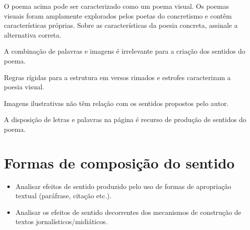 {

O poema acima pode ser caracterizado como um poema visual. Os poemas
visuais foram amplamente explorados pelos poetas do concretismo e contêm características próprias. Sobre as características da poesia
concreta, assinale a alternativa correta.

\begin{escolha}

  \item A combinação de palavras e imagens é irrelevante para a criação dos sentidos do poema. 

  \item Regras rígidas para a estrutura em versos rimados e estrofes 
  caracterizam a poesia visual.

  \item Imagens ilustrativas não têm relação com os sentidos propostos 
  pelo autor.

  \item A disposição de letras e palavras na página é recurso de produção de sentidos do poema.

\end{escolha}


\chapter{Formas de composição do sentido}


\begin{itemize}
  
  \item Analisar efeitos de sentido produzido pelo uso de formas de apropriação 
  textual (paráfrase, citação etc.).
  
  \item Analisar os efeitos de sentido decorrentes dos mecanismos de construção 
  de textos jornalísticos/midiáticos.


\end{itemize}}
